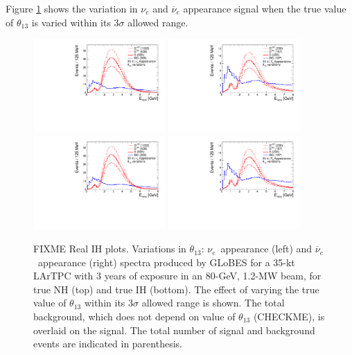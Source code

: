 \documentclass[letterpaper,11pt]{article}
\begin{document}
Figure \ref{fig:th13spec} shows the variation in $\nu_e$ and $\overline{\nu}_e$
appearance signal when the true value of $\theta_{13}$ is varied within its 3$\sigma$
allowed range. 
\begin{figure}[!htb]
  \centering
  \includegraphics[width=0.45\textwidth]{figs/spectra_35kt_nue_th13var.pdf}
  \includegraphics[width=0.45\textwidth]{figs/spectra_35kt_nuebar_th13var.pdf}
  \includegraphics[width=0.45\textwidth]{figs/spectra_35kt_nue_th13var.pdf}
  \includegraphics[width=0.45\textwidth]{figs/spectra_35kt_nuebar_th13var.pdf}
  \caption{FIXME Real IH plots.
  Variations in $\theta_{13}$: 
  $\nu_e$~appearance (left) and $\overline{\nu}_e$~appearance (right) spectra 
  produced by GLoBES for a 35-kt LArTPC with 3 years of 
  exposure in an 80-GeV, 1.2-MW beam,  for true NH (top) and true IH (bottom). 
  The effect of varying the true
  value of $\theta_{13}$ within its 3$\sigma$ allowed range is shown. 
  The total background, which does not depend on value of $\theta_{13}$ (CHECKME), 
  is overlaid on the signal. The total number
  of signal and background events are indicated in parenthesis.}
  \label{fig:th13spec}
\end{figure}
\end{document}
